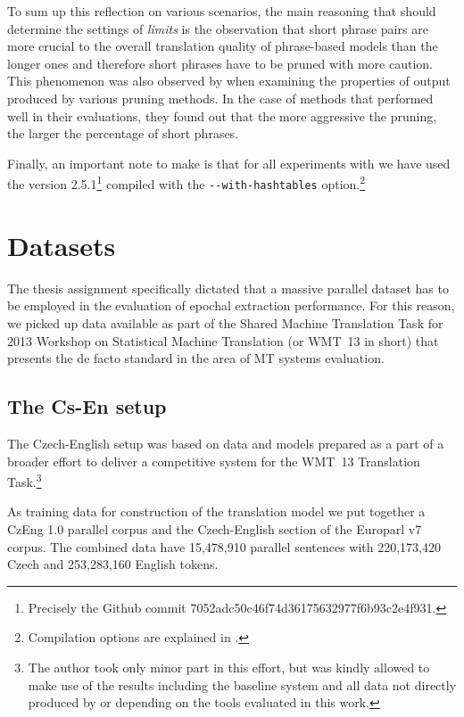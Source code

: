 To sum up this reflection on various \eppex{} scenarios, the main reasoning that should
determine the settings of \emph{limits} is the observation that short phrase pairs are
more crucial to the overall translation quality of phrase-based models than the longer ones
and therefore short phrases have to be pruned with more caution.
This phenomenon was also observed by \citet{zens:systcomp} when examining the
properties of output produced by various pruning methods. In the case of methods that
performed well in their evaluations, they found out that the more aggressive the pruning,
the larger the percentage of short phrases.

Finally, an important note to make is that for all experiments with \eppex{} we have used
the version 2.5.1\footnote{Precisely the Github commit 7052adc50c46f74d36175632977f6b93c2e4f931.}
compiled with the \verb|--with-hashtables| option.\footnote{Compilation options are explained in
.}

\section{Datasets}

The thesis assignment specifically dictated that a massive parallel dataset has to be
employed in the evaluation of epochal extraction performance.
For this reason, we picked up data available as part of the Shared Machine Translation Task
for 2013 Workshop on Statistical Machine Translation (or WMT~13 in short) that presents
the de facto standard in the area of MT systems evaluation.

\subsection{The Cs-En setup}

The Czech-English setup was based on data and models prepared as a part of a broader
effort to deliver a competitive system for the WMT~13 Translation Task.\footnote{The author
took only minor part in this effort, but was kindly allowed to make use of the results
including the baseline system and all data not directly produced by or depending on
the tools evaluated in this work.}

As training data for construction of the translation model we put together a CzEng 1.0
parallel corpus \citep{czeng10:lrec2012}
and the Czech-English section of the Europarl v7 corpus.
The combined data have 15,478,910 parallel sentences with 220,173,420 Czech and 253,283,160
English tokens.

